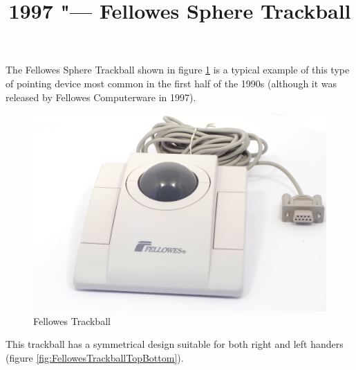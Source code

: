 \documentclass[11pt, a4paper]{article}
\begin{document}
\title{1997 "--- Fellowes Sphere Trackball}
\date{}
\maketitle

The Fellowes Sphere Trackball shown in figure \ref{fig:FellowesTrackballPic} is a typical example of this type of pointing device most common in the first half of the 1990s (although it was released by Fellowes Computerware in 1997).

\begin{figure}[h]
    \centering
    \includegraphics[scale=0.5]{1997_fellowes_trackball/pic_30.jpg}
    \caption{Fellowes Trackball}
    \label{fig:FellowesTrackballPic}
\end{figure}

This trackball has a symmetrical design suitable for both right and left handers (figure \ref{fig:FellowesTrackballTopBottom}).
\end{document}
